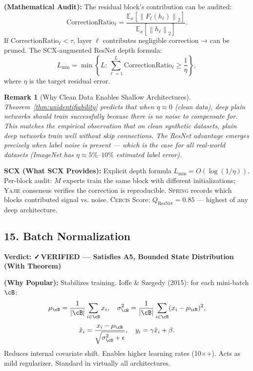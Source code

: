 \documentclass[12pt,a4paper]{article}
\newtheorem{remark}[theorem]{Remark}
\theoremstyle{definition}
\newcommand{\verified}{{\color{verifiedcolor}\textbf{✓\,VERIFIED}}}
\newcommand{\Yajie}{\textsc{Yajie}}
\newcommand{\Spring}{\textsc{Spring}}
\newcommand{\Cercis}{\textsc{Cercis}}
\newcommand{\E}{\mathbb{E}}
\newcommand{\norm}[1]{\left\lVert#1\right\rVert}
\newcommand{\auditHeader}[1]{\medskip\noindent\textbf{\large #1}\medskip}
\newcommand{\whyPopular}{\noindent\textbf{ (Why Popular):} }
\newcommand{\whatMissing}{\noindent\textbf{SCX (What SCX Provides):} }
\newcommand{\mathAudit}{\noindent\textbf{ (Mathematical Audit):} }
\begin{document}
\mathAudit{} The residual block's contribution can be audited:
\[
\text{CorrectionRatio}_\ell = \frac{\E_x[\norm{F_\ell(h_\ell)}_2]}{\E_x[\norm{h_\ell}_2]}.
\]
If $\text{CorrectionRatio}_\ell < \tau$, layer $\ell$ contributes negligible correction → can be pruned. The SCX-augmented ResNet depth formula:
\[
L_{\min} = \min\left\{L : \sum_{\ell=1}^L \text{CorrectionRatio}_\ell \ge \frac{1}{\eta}\right\},
\]
where $\eta$ is the target residual error.

\begin{remark}[Why Clean Data Enables Shallow Architectures]
Theorem~\ref{thm:unidentifiability} predicts that when $\eta \approx 0$ (clean data), deep plain networks should train successfully because there is no noise to compensate for. This matches the empirical observation that on clean synthetic datasets, plain deep networks train well without skip connections. The ResNet advantage emerges precisely when label noise is present — which is the case for all real-world datasets (ImageNet has $\eta \approx 5\%$--$10\%$ estimated label error).
\end{remark}

\whatMissing{} Explicit depth formula $L_{\min} = O(\log(1/\eta))$. Per-block audit: $M$ experts train the same block with different initializations; \Yajie{} consensus verifies the correction is reproducible. \Spring{} records which blocks contributed signal vs. noise. \Cercis{} Score: $Q_{\text{ResNet}} = 0.85$ — highest of any deep architecture.

\subsection{15. Batch Normalization }

\auditHeader{Verdict: \verified{} — Satisfies A5, Bounded State Distribution (With Theorem)}

\whyPopular{} Stabilizes training. Ioffe \& Szegedy (2015): for each mini-batch $\cB$:
\[
\mu_\cB = \frac{1}{|\cB|}\sum_{i \in \cB} x_i, \quad \sigma_\cB^2 = \frac{1}{|\cB|}\sum_{i \in \cB} (x_i - \mu_\cB)^2,
\]
\[
\hat{x}_i = \frac{x_i - \mu_\cB}{\sqrt{\sigma_\cB^2 + \epsilon}}, \quad y_i = \gamma \hat{x}_i + \beta.
\]
Reduces internal covariate shift. Enables higher learning rates (10$\times$+). Acts as mild regularizer. Standard in virtually all architectures.
\end{document}
